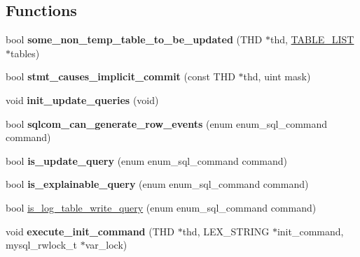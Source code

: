 \subsection*{Functions}
\begin{DoxyCompactItemize}
\item 
\mbox{\label{group__Runtime__Environment_ga28dd9a1a616e1e1855b482ab1346f18e}} 
bool {\bfseries some\+\_\+non\+\_\+temp\+\_\+table\+\_\+to\+\_\+be\+\_\+updated} (T\+HD $\ast$thd, \mbox{\hyperlink{structTABLE__LIST}{T\+A\+B\+L\+E\+\_\+\+L\+I\+ST}} $\ast$tables)
\item 
\mbox{\label{group__Runtime__Environment_ga4c2f693556d7e6b0d1cf38ad801ae51c}} 
bool {\bfseries stmt\+\_\+causes\+\_\+implicit\+\_\+commit} (const T\+HD $\ast$thd, uint mask)
\item 
\mbox{\label{group__Runtime__Environment_ga50e3f222a46f347db65d19bd17941286}} 
void {\bfseries init\+\_\+update\+\_\+queries} (void)
\item 
\mbox{\label{group__Runtime__Environment_ga5544094e643119252380d39ac8cd2efa}} 
bool {\bfseries sqlcom\+\_\+can\+\_\+generate\+\_\+row\+\_\+events} (enum enum\+\_\+sql\+\_\+command command)
\item 
\mbox{\label{group__Runtime__Environment_gacd6cd553a8c7199f9ab84c0f72871177}} 
bool {\bfseries is\+\_\+update\+\_\+query} (enum enum\+\_\+sql\+\_\+command command)
\item 
\mbox{\label{group__Runtime__Environment_ga4b1b314a012674325f76ce371614df4d}} 
bool {\bfseries is\+\_\+explainable\+\_\+query} (enum enum\+\_\+sql\+\_\+command command)
\item 
bool \mbox{\hyperlink{group__Runtime__Environment_ga1eaa146f67e2bd9604ec2ec0645ba81c}{is\+\_\+log\+\_\+table\+\_\+write\+\_\+query}} (enum enum\+\_\+sql\+\_\+command command)
\item 
\mbox{\label{group__Runtime__Environment_ga10e39fc20b643c491433d588e0cc1c0e}} 
void {\bfseries execute\+\_\+init\+\_\+command} (T\+HD $\ast$thd, L\+E\+X\+\_\+\+S\+T\+R\+I\+NG $\ast$init\+\_\+command, mysql\+\_\+rwlock\+\_\+t $\ast$var\+\_\+lock)

\end{DoxyCompactItemize}
